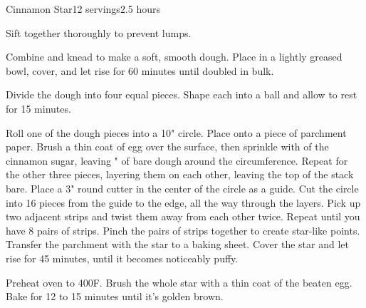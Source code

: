 \documentclass[../Cookbook.tex]{subfiles}
\begin{document}
\begin{recipe}[CinnamonStar]{Cinnamon Star}{12 servings}{2.5 hours}

Sift together thoroughly to prevent lumps.

Combine and knead to make a soft, smooth dough.
Place in a lightly greased bowl, cover, and let rise for 60 minutes until doubled in bulk.

Divide the dough into four equal pieces.
Shape each into a ball and allow to rest for 15 minutes.

Roll one of the dough pieces into a 10" circle.
Place onto a piece of parchment paper.
Brush a thin coat of egg over the surface, then sprinkle with  of the cinnamon sugar, leaving " of bare dough around the circumference.
Repeat for the other three pieces, layering them on each other, leaving the top of the stack bare.
Place a 3" round cutter in the center of the circle as a guide.
Cut the circle into 16 pieces from the guide to the edge, all the way through the layers.
Pick up two adjacent strips and twist them away from each other twice.
Repeat until you have 8 pairs of strips.
Pinch the pairs of strips together to create star-like points.
Transfer the parchment with the star to a baking sheet.
Cover the star and let rise for 45 minutes, until it becomes noticeably puffy.

Preheat oven to 400\0F.
Brush the whole star with a thin coat of the beaten egg.
Bake for 12 to 15 minutes until it's golden brown.

\end{recipe}
\end{document}

